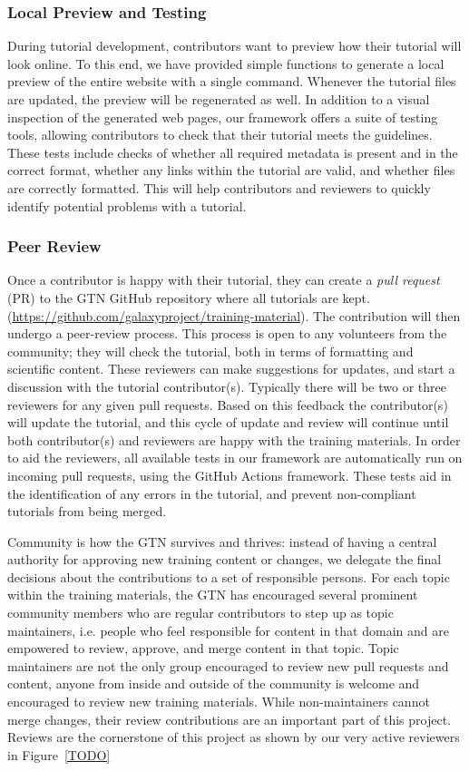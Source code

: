 \documentclass[10pt,letterpaper]{article}
\begin{document}
\subsubsection*{Local Preview and Testing}

During tutorial development, contributors want to preview how their tutorial will look online.
To this end, we have provided simple functions to generate a local preview of the entire website with a single command. Whenever the tutorial files are updated, the preview will be regenerated as well.
In addition to a visual inspection of the generated web pages, our framework offers a suite of testing tools, allowing contributors to check that their tutorial meets the guidelines.
These tests include checks of whether all required metadata is present and in the correct format, whether any links within the tutorial are valid, and whether files are correctly formatted.
This will help contributors and reviewers to quickly identify potential problems with a tutorial.

\subsubsection*{Peer Review}

Once a contributor is happy with their tutorial, they can create a \emph{pull request} (PR) to the GTN GitHub repository where all tutorials are kept.  (\url{https://github.com/galaxyproject/training-material}).
The contribution will then undergo a peer-review process.
This process is open to any volunteers from the community; they will check the tutorial, both in terms of formatting and scientific content.
These reviewers can make suggestions for updates, and start a discussion with the tutorial contributor(s).
Typically there will be two or three reviewers for any given pull requests.
Based on this feedback the contributor(s) will update the tutorial, and this cycle of update and review will continue until both contributor(s) and reviewers are happy with the training materials.
In order to aid the reviewers, all available tests in our framework are automatically run on incoming pull requests, using the GitHub Actions framework.
These tests aid in the identification of any errors in the tutorial, and prevent non-compliant tutorials from being merged.

Community is how the GTN survives and thrives: instead of having a central authority for approving new training content or changes, we delegate the final decisions about the contributions to a set of responsible persons.
For each topic within the training materials, the GTN has encouraged several prominent community members who are regular contributors to step up as topic maintainers, i.e. people who feel responsible for content in that domain and are empowered to review, approve, and merge content in that topic.
Topic maintainers are not the only group encouraged to review new pull requests and content, anyone from inside and outside of the community is welcome and encouraged to review new training materials.
While non-maintainers cannot merge changes, their review contributions are an important part of this project.
Reviews are the cornerstone of this project as shown by our very active reviewers in Figure~\ref{TODO}
\end{document}
